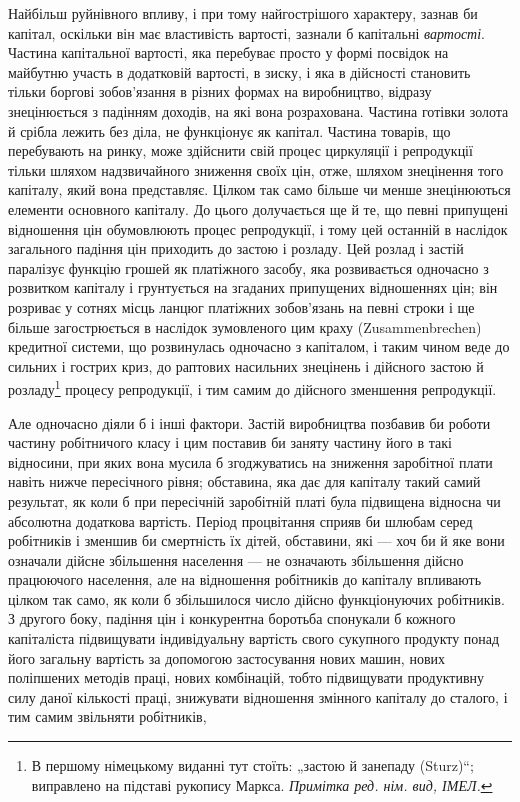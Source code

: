Найбільш руйнівного впливу, і при тому найгострішого
характеру, зазнав би капітал, оскільки він має властивість
вартості, зазнали б капітальні \emph{вартості}. Частина капітальної
вартості, яка перебуває просто у формі посвідок на майбутню
участь в додатковій вартості, в зиску, і яка в дійсності становить
тільки боргові зобов’язання в різних формах на виробництво,
відразу знецінюється з падінням доходів, на які вона розрахована.
Частина готівки золота й срібла лежить без діла, не функціонує
як капітал. Частина товарів, що перебувають на ринку, може
здійснити свій процес циркуляції і репродукції тільки шляхом
надзвичайного зниження своїх цін, отже, шляхом знецінення
того капіталу, який вона представляє. Цілком так само більше
чи менше знецінюються елементи основного капіталу. До цього
долучається ще й те, що певні припущені відношення цін
обумовлюють процес репродукції, і тому цей останній в наслідок
загального падіння цін приходить до застою і розладу. Цей
розлад і застій паралізує функцію грошей як платіжного засобу,
яка розвивається одночасно з розвитком капіталу і грунтується
на згаданих припущених відношеннях цін; він розриває у сотнях
місць ланцюг платіжних зобов’язань на певні строки і ще більше
загострюється в наслідок зумовленого цим краху (Zusammenbrechen)
кредитної системи, що розвинулась одночасно з капіталом,
і таким чином веде до сильних і гострих криз, до раптових
насильних знецінень і дійсного застою й розладу\footnote*{
В першому німецькому виданні тут стоїть: „застою й занепаду (Sturz)“;
виправлено на підставі рукопису Маркса. \emph{Примітка ред. нім. вид, ІМЕЛ.}
} процесу
репродукції, і тим самим до дійсного зменшення репродукції.

Але одночасно діяли б і інші фактори. Застій виробництва
позбавив би роботи частину робітничого класу і цим поставив би
заняту частину його в такі відносини, при яких вона мусила б
згоджуватись на зниження заробітної плати навіть нижче пересічного
рівня; обставина, яка дає для капіталу такий самий результат,
як коли б при пересічній заробітній платі була підвищена
відносна чи абсолютна додаткова вартість. Період процвітання
сприяв би шлюбам серед робітників і зменшив би смертність їх
дітей, обставини, які — хоч би й яке вони означали дійсне збільшення
населення — не означають збільшення дійсно працюючого
населення, але на відношення робітників до капіталу впливають
цілком так само, як коли б збільшилося число дійсно функціонуючих
робітників. З другого боку, падіння цін і конкурентна
боротьба спонукали б кожного капіталіста підвищувати індивідуальну
вартість свого сукупного продукту понад його загальну
вартість за допомогою застосування нових машин, нових поліпшених
методів праці, нових комбінацій, тобто підвищувати продуктивну
силу даної кількості праці, знижувати відношення
змінного капіталу до сталого, і тим самим звільняти робітників,
\parbreak{}  %
